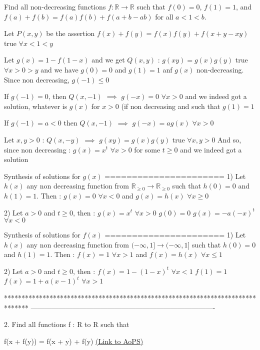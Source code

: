 \begin{solution}
	\begin{tcolorbox}Find all non-decreasing functions $f: \mathbb{R} \to \mathbb{R}$ such that $f(0)=0$, $f(1)=1$, and $f(a)+f(b)=f(a)f(b)+f(a+b-ab)$ for all $a<1<b$.\end{tcolorbox}
Let $P(x,y)$ be the assertion $f(x)+f(y)=f(x)f(y)+f(x+y-xy)$ true $\forall x<1<y$

Let $g(x)=1-f(1-x)$ and we get $Q(x,y)$ : $g(xy)=g(x)g(y)$ true $\forall x>0>y$
and we have $g(0)=0$ and $g(1)=1$ anf $g(x)$ non-decreasing.
Since non decreasing, $g(-1)\le 0$

If $g(-1)=0$, then $Q(x,-1)$ $\implies$ $g(-x)=0$ $\forall x>0$ and we indeed got a solution, whatever is $g(x)$ for $x>0$ (if non decreasing and such that $g(1)=1$

If $g(-1)=a<0$ then $Q(x,-1)$ $\implies$ $g(-x)=ag(x)$ $\forall x>0$

Let $x,y>0$ : $Q(x,-y)$ $\implies$ $g(xy)=g(x)g(y)$ true $\forall x,y>0$
And so, since non decreasing : $g(x)=x^t$ $\forall x>0$ for some $t\ge 0$ and we indeed got a solution

Synthesis of solutions for $g(x)$
======================
1) 
Let $h(x)$ any non decreasing function from $\mathbb R_{\ge 0}\to\mathbb R_{\ge 0}$ such that $h(0)=0$ and $h(1)=1$. Then :
$g(x)=0$ $\forall x< 0$ and $g(x)=h(x)$ $\forall x\ge 0$ 

2) Let $a>0$ and $t\ge 0$, then :
$g(x)=x^t$ $\forall x>0$
$g(0)=0$
$g(x)=-a(-x)^t$ $\forall x<0$


Synthesis of solutions for $f(x)$
======================
1) 
Let $h(x)$ any non decreasing function from $(-\infty,1]\to(-\infty,1]$ such that $h(0)=0$ and $h(1)=1$. Then :
$f(x)=1$ $\forall x>1$ and $f(x)=h(x)$ $\forall x\le 1$ 

2) Let $a>0$ and $t\ge 0$, then :
$f(x)=1-(1-x)^t$ $\forall x<1$
$f(1)=1$
$f(x)=1+a(x-1)^t$ $\forall x>1$
\end{solution}
*******************************************************************************
-------------------------------------------------------------------------------

\begin{problem}
	2. Find all functions f : R to R such that

f(x + f(y)) = f(x + y) + f(y)
	\flushright \href{https://artofproblemsolving.com/community/c6h466398}{(Link to AoPS)}
\end{problem}



